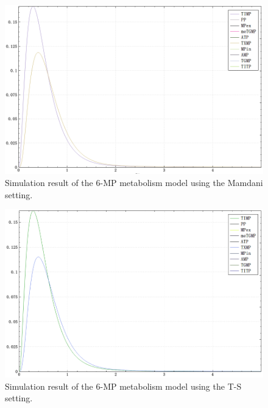 \documentclass[journal,a4paper,onecolumn]{article}
\begin{document}
\begin{figure}[!hbt]
	\begin{center}
		\includegraphics[width=\columnwidth]{fig55}
		\caption{Simulation result of the 6-MP metabolism model using the Mamdani setting.}
		\label{fig:Simulation result of 6-MP metabolism using Mamdani.}
	\end{center}
\end{figure}

\begin{figure}[!hbt]
	\begin{center}
		\includegraphics[width=\columnwidth]{fig56}
		\caption{Simulation result of the 6-MP metabolism model using the T-S setting.}
		\label{fig:Simulation result of 6-MP metabolism using T-S.}
	\end{center}
\end{figure}


\clearpage

\end{document}
